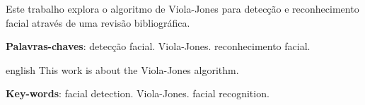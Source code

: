 
\setlength{\absparsep}{18pt} %
\begin{resumo}
Este trabalho explora o algoritmo de Viola-Jones para detecção e reconhecimento facial através de uma revisão bibliográfica.

 \textbf{Palavras-chaves}: detecção facial. Viola-Jones. reconhecimento facial.
\end{resumo}

\begin{resumo}[Abstract]
 \begin{otherlanguage*}{english}
   This work is about the Viola-Jones algorithm.

   \vspace{\onelineskip}
 
   \noindent 
   \textbf{Key-words}: facial detection. Viola-Jones. facial recognition.
 \end{otherlanguage*}
\end{resumo}

 

  

